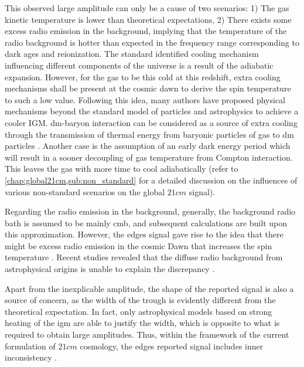 \documentclass[12pt, TexShade, letterpaper]{report}
\begin{document}
 This observed large amplitude can only be a cause of two scenarios: 1) The gas kinetic temperature is lower than theoretical expectations, 2) There exists some excess radio emission in the background, implying that the temperature of the radio background is hotter than expected in the frequency range corresponding to dark ages and reionization. The standard identified cooling mechanism influencing different components of the universe is a result of the adiabatic expansion. However, for the gas to be this cold at this redshift, extra cooling mechanisms shall be present at the cosmic dawn to derive the spin temperature to such a low value. Following this idea, many authors have proposed physical mechanisms beyond the standard model of particles and astrophysics to achieve a cooler IGM. \gls{dm}-baryon interaction can be considered as a source of extra cooling through the transmission of thermal energy from baryonic particles of gas to \gls{dm} particles \cite{dm_edges_1, dm_edges_2, dm_edges_3, dm_edges_4, dm_edges_5, dm_edges_6}. Another case is the assumption of an early dark energy period which will result in a sooner decoupling of gas temperature from Compton interaction. This leaves the gas with more time to cool adiabatically \cite{early_dark_energy, thesis_shedding} (refer to \ref{chap:global21cm,sub:non_standard} for a detailed discussion on the influences of various non-standard scenarios on the global $21cm$ signal).\par
 Regarding the radio emission in the background, generally, the background radio bath is assumed to be mainly \gls{cmb}, and subsequent calculations are built upon this approximation. However, the \gls{edges} signal gave rise to the idea that there might be excess radio emission in the cosmic Dawn that increases the spin temperature \cite{excess_radio}. Recent studies revealed that the diffuse radio background from astrophysical origins is unable to explain the discrepancy \cite{excess_radio, thesis_shedding}.\par
 Apart from the inexplicable amplitude, the shape of the reported signal is also a source of concern, as the width of the trough is evidently different from the theoretical expectation. In fact, only astrophysical models based on strong heating of the \gls{igm} are able to justify the width, which is opposite to what is required to obtain large amplitudes. Thus, within the framework of the current formulation of $21cm$ cosmology, the \gls{edges} reported signal includes inner inconsistency \cite{edges_inconsistent_inner, thesis_shedding}.\par
\end{document}
